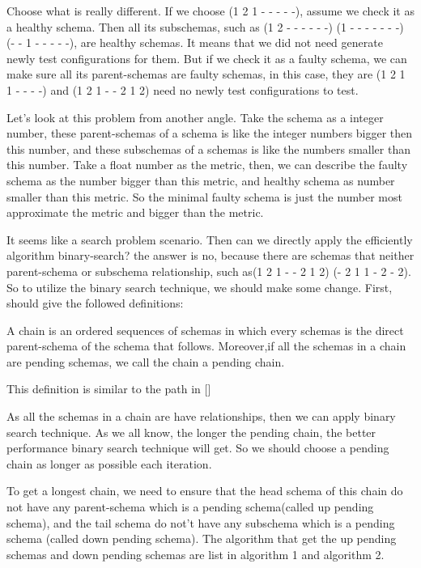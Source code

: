 \documentclass[10pt,journal,cspaper,compsoc]{IEEEtran}
\begin{document}
Choose what is really different. If we choose (1 2 1 - - - - -), assume we check it as a healthy schema. Then all its subschemas, such as (1 2 - - - - - -) (1 - - - - - - -)  (- - 1 - - - - -), are healthy schemas. It means that we did not need generate newly test configurations for them. But if we check it as a faulty schema, we can make sure all its parent-schemas are faulty schemas, in this case, they are (1 2 1 1 - - - -) and (1 2 1 - - 2 1 2) need no newly test configurations to test.

Let's look at this problem from another angle. Take the schema as a integer number, these parent-schemas of a schema is like the integer numbers bigger then this number, and these subschemas of a schemas is like the numbers smaller than this number. Take a float number as the metric, then, we can describe the faulty schema as the number bigger than this metric, and healthy schema as number smaller than this metric. So the minimal faulty schema is just the number most approximate the metric and bigger than the metric.

It seems like a search problem scenario. Then can we directly apply the efficiently algorithm binary-search? the answer is no, because there are schemas that neither parent-schema or subschema relationship, such as(1 2 1 - - 2 1 2) (- 2 1 1 - 2 - 2). So to utilize the binary search technique, we should make some change. First, should give the followed definitions:

\begin{definition}[chain]
A chain is an ordered sequences of schemas in which every schemas is the direct parent-schema of the schema that follows. Moreover,if all the schemas in a chain are pending schemas, we call the chain a pending chain.
\end{definition}
This definition is similar to the path in []

As all the schemas in a chain are have relationships, then we can apply binary search technique. As we all know, the longer the pending chain, the better performance binary search technique will get. So we should choose a pending chain as longer as possible each iteration.

To get a longest chain, we need to ensure that the head schema of this chain do not have any parent-schema which is a pending schema(called up pending schema), and the tail schema do not't have any subschema which is a pending schema (called down pending schema). The algorithm that get the up pending schemas and down pending schemas are list in algorithm 1 and algorithm 2.
\end{document}
